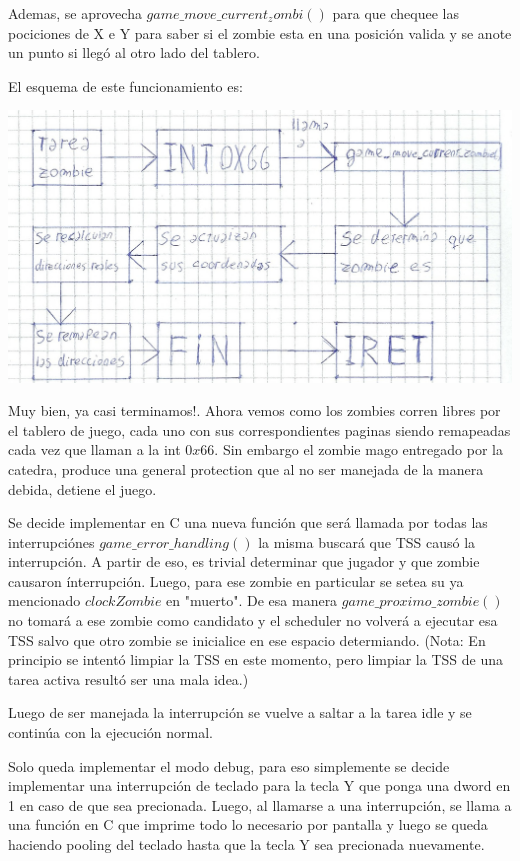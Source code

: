 \documentclass[a4paper]{article}
\begin{document}
Ademas, se aprovecha $game\_move\_current_zombi()$ para que chequee las pociciones de X e Y para saber si el zombie esta en una posición valida y se anote un punto si llegó al otro lado del tablero.

El esquema de este funcionamiento es:


\includegraphics[scale=0.9]{dibujos/dibujo3.jpg}\\
\newpage

Muy bien, ya casi terminamos!. Ahora vemos como los zombies corren libres por el tablero de juego, cada uno con sus correspondientes paginas siendo remapeadas cada vez que llaman a la int $0x66$. Sin embargo el zombie mago entregado por la catedra, produce una general protection que al no ser manejada de la manera debida, detiene el juego.

Se decide implementar en C una nueva función que será llamada por todas las interrupciónes $game\_error\_handling()$ la misma buscará que TSS causó la interrupción. A partir de eso, es trivial determinar que jugador y que zombie causaron ínterrupción. Luego, para ese zombie en particular se setea su ya mencionado $clockZombie$ en "muerto". De esa manera $game\_ proximo\_ zombie()$ no tomará a ese zombie como candidato y el scheduler no volverá a ejecutar esa TSS salvo que otro zombie se inicialice en ese espacio determiando. (Nota: En principio se intentó limpiar la TSS en este momento, pero limpiar la TSS de una tarea activa resultó ser una mala idea.)

Luego de ser manejada la interrupción se vuelve a saltar a la tarea idle y se continúa con la ejecución normal.

Solo queda implementar el modo debug, para eso simplemente se decide implementar una interrupción de teclado para la tecla Y que ponga una dword en 1 en caso de que sea precionada. Luego, al llamarse a una interrupción, se llama a una función en C que imprime todo lo necesario por pantalla y luego se queda haciendo pooling del teclado hasta que la tecla Y sea precionada nuevamente.
\end{document}
